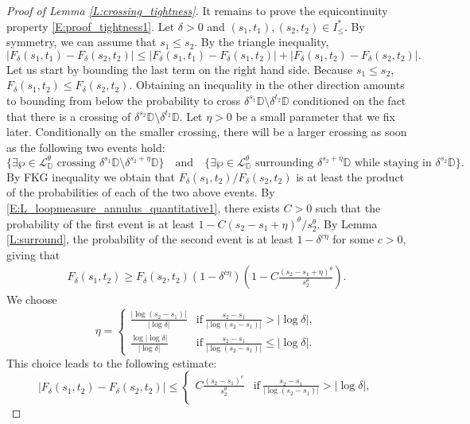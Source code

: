 \documentclass[11pt]{article}
\theoremstyle{remark}
\newcommand{\D}{\mathbb{D}}
\newcommand{\Lc}{\mathcal{L}}
\newcommand{\abs}[1]{\left\vert #1 \right\vert}
\numberwithin{equation}{section}
\begin{document}
\begin{proof}[Proof of Lemma \ref{L:crossing_tightness}]
It remains to prove the equicontinuity property \eqref{E:proof_tightness1}. Let $\delta >0$ and $(s_1,t_1), (s_2,t_2) \in I_\leq^*$. By symmetry, we can assume that $s_1 \leq s_2$. By the triangle inequality,
\begin{equation}
\label{E:proof_tightness}
|F_\delta(s_1,t_1) - F_\delta(s_2,t_2)|
\leq |F_\delta(s_1,t_1) - F_\delta(s_1,t_2)| + |F_\delta(s_1,t_2) - F_\delta(s_2,t_2)|.
\end{equation}
Let us start by bounding the last term on the right hand side. Because $s_1 \leq s_2$, 
$F_\delta(s_1,t_2) \leq F_\delta(s_2,t_2)$. 
Obtaining an inequality in the other direction amounts to bounding from below the probability to cross $\delta^{s_1} \D \setminus \delta^{t_2} \D$ conditioned on the fact that there is a crossing of $\delta^{s_2} \D \setminus \delta^{t_2} \D$. Let $\eta>0$ be a small parameter that we fix later. Conditionally on the smaller crossing, there will be a larger crossing as soon as the following two events hold:
\[
\{ \exists \wp \in \Lc_\D^\theta \text{~crossing~} \delta^{s_1} \D \setminus \delta^{s_2 + \eta} \D \}
\quad \text{and} \quad
\{ \exists \wp \in \Lc_\D^\theta \text{~surrounding~} \delta^{s_2 + \eta} \D \text{~while~staying~in~} \delta^{s_2} \D\}.
\]
By FKG inequality we obtain that $F_\delta(s_1,t_2) / F_\delta(s_2,t_2)$ is at least the product of the probabilities of each of the two above events. By \eqref{E:L_loopmeasure_annulus_quantitative1}, there exists $C>0$ such that the probability of the first event is at least $1 - C (s_2-s_1+\eta)^\theta/s_2^\theta$. By Lemma \ref{L:surround}, the probability of the second event is at least $1- \delta^{c\eta}$ for some $c>0$, giving that
\begin{align*}
F_\delta(s_1,t_2) \geq F_\delta(s_2,t_2) ( 1- \delta^{c\eta}) \left(1- C \frac{(s_2-s_1+\eta)^\theta}{s_2^\theta} \right).
\end{align*}
We choose
\[
\eta = \left\{ \begin{array}{ll}
\frac{|\log (s_2-s_1)|}{|\log \delta|} & \text{if}~ \frac{s_2-s_1}{|\log (s_2-s_1)|} > |\log \delta|, \\
\frac{\log |\log \delta|}{|\log \delta|} & \text{if}~ \frac{s_2-s_1}{|\log (s_2-s_1)|} \leq |\log \delta|.
\end{array} \right.
\]
This choice leads to the following estimate:
\[
\abs{F_\delta(s_1,t_2) - F_\delta(s_2,t_2) } \leq
\left\{ \begin{array}{ll}
C \frac{(s_2-s_1)^c}{s_2^\theta} & \text{if}~ \frac{s_2-s_1}{|\log (s_2-s_1)|} > |\log \delta|, \\

\end{array}\]
\end{proof}
\end{document}
